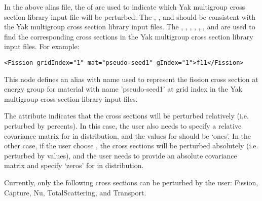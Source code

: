 %
In the above alias file, the  of  are used to indicate
which Yak multigroup cross section library input file will be perturbed.
The , , and 
should be consistent with the Yak multigroup cross section library input files.
The , , , , ,
, and  are used to find the corresponding cross sections in the Yak multigroup cross
section library input files. For example:
%
\begin{lstlisting}[style=XML]
<Fission gridIndex="1" mat="pseudo-seed1" gIndex="1">f11</Fission>
\end{lstlisting}
%
This node defines an alias with name  used to represent the fission cross section at energy group 
for material with name 'pseudo-seed1' at grid index  in the Yak multigroup cross section library input files.

\nb The attribute  indicates that the cross sections will be perturbed relatively (i.e. perturbed by
percents). In this case, the user also needs to specify a relative covariance matrix for  in
 distribution, and the values for  should be `ones'. In the other case, if
the user choose , the cross sections will be perturbed absolutely (i.e. perturbed by values), and
the user needs to provide an absolute covariance matrix and specify `zeros' for  in 
distribution.

\nb Currently, only the following cross sections can be perturbed by the user: Fission, Capture, Nu, TotalScattering,
and Transport.

